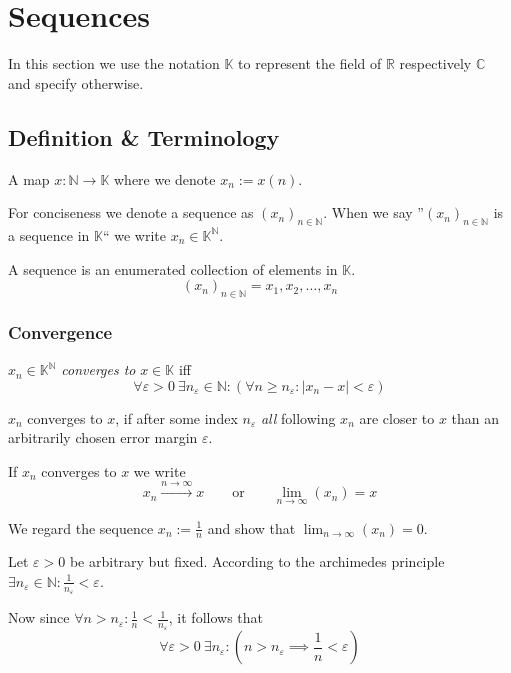 \section{Sequences}
In this section we use the notation \(\mathbb{K}\) to represent the field of \(\mathbb{R}\) respectively \(\mathbb{C}\) and specify otherwise.

\subsection{Definition \& Terminology}
\begin{definition}[Sequence]
   A map \(x: \mathbb{N} \to \mathbb{K}\) where we denote \(x_n := x(n)\).
\end{definition}
\begin{remark}[Notation]
   For conciseness we denote a sequence as \((x_n)_{n \in \mathbb{N}}\).
   When we say ''\((x_n)_{n \in \mathbb{N}}\) is a sequence in \(\mathbb{K}\)`` we write \(x_n \in \mathbb{K}^\mathbb{N}\).
\end{remark}
\begin{remark}[Intuition]
   A sequence is an enumerated collection of elements in \(\mathbb{K}\).
   \[(x_n)_{n \in \mathbb{N}} = x_1, x_2, \ldots, x_n\]
\end{remark}

\subsubsection{Convergence}
\begin{definition}\label{def:conv_seq}
   \(x_n \in \mathbb{K}^\mathbb{N}\) \emph{converges to} \(x \in \mathbb{K}\) iff
   \[\forall \varepsilon > 0~\exists n_\varepsilon \in \mathbb{N}: (\forall n \geq n_\varepsilon: |x_n - x| < \varepsilon)\]
\end{definition}
\begin{remark}[Intuition]
   \(x_n\) converges to \(x\), if after some index \(n_\varepsilon\) \emph{all} following \(x_n\) are closer to \(x\) than an arbitrarily chosen error margin \(\varepsilon\).
\end{remark}
\begin{remark}[Notation]
   If \(x_n\) converges to \(x\) we write
   \[x_n \xrightarrow{n \to \infty} x \qquad\text{or}\qquad \lim_{n \to \infty}(x_n) = x\]
\end{remark}
\begin{example}
   We regard the sequence \(x_n := \frac{1}{n}\) and show that \(\lim_{n \to \infty}(x_n) = 0\).

   Let \(\varepsilon > 0\) be arbitrary but fixed.
   According to the archimedes principle \(\exists n_\varepsilon \in \mathbb{N}: \frac{1}{n_\varepsilon} < \varepsilon\).

   Now since \(\forall n > n_\varepsilon: \frac{1}{n} < \frac{1}{n_\varepsilon}\), it follows that
   \[\forall \varepsilon > 0~\exists n_\varepsilon: \left(n > n_\varepsilon \implies \frac{1}{n} < \varepsilon\right)\]

   \begin{center}
      
   \end{center}
\end{example}

